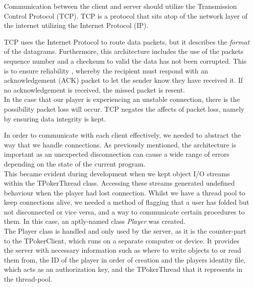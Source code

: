 \documentclass[11pt]{article}
\begin{document}

Communication between the client and server should utilize the Transmission Control Protocol (TCP). 
TCP is a protocol that sits atop of the network layer of the internet utilizing the Internet Protocol (IP)\cite{ip}.

TCP uses the Internet Protocol to route data packets, but it describes the \textit{format} of the datagrams. Furthermore, this architecture includes the use of the packets sequence number and a checksum to valid the data has not been corrupted. This is to ensure reliability \cite{tcp}, whereby the recipient must respond with an acknowledgement (ACK) packet to let the sender know they have received it. If no acknowledgement is received, the missed packet is resent.\\

In the case that our player is experiencing an unstable connection, there is the possibility packet loss will occur. TCP negates the affects of packet loss, namely by ensuring data integrity is kept.


In order to communicate with each client effectively, we needed to abstract the way that we handle connections. As previously mentioned, the architecture is important as an unexpected disconnection can cause a wide range of errors depending on the state of the current program. \\ %

This became evident during development when we kept object I/O streams within the TPokerThread class. Accessing these streams generated undefined behaviour when the player had lost connection. Whilst we have a thread pool to keep connections alive, we needed a method of flagging that a user has folded but not disconnected or vice versa, and a way to communicate certain procedures to them. In this case, an aptly-named class \textit{Player} was created. \\

The Player class is handled and only used by the server, as it is the counter-part to the TPokerClient, which runs on a separate computer or device. It provides the server with necessary information such as where to write objects to or read them from, the ID of the player in order of creation and the players identity file, which acts as an authorization key, and the TPokerThread that it represents in the thread-pool. \\
\end{document}

